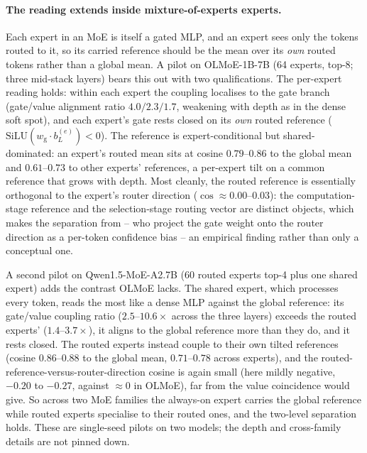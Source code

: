 \documentclass[11pt]{article}
\newcommand{\bl}{b_L}
\newcommand{\wg}{w_{\mathrm{g}}}
\begin{document}
\paragraph{The reading extends inside mixture-of-experts experts.}
Each expert in an MoE is itself a gated MLP, and an expert sees only the tokens
routed to it, so its carried reference should be the mean over its \emph{own}
routed tokens rather than a global mean. A pilot on OLMoE-1B-7B (64 experts,
top-8; three mid-stack layers) bears this out with two qualifications. The
per-expert reading holds: within each expert the coupling localises to the gate
branch (gate/value alignment ratio $4.0/2.3/1.7$, weakening with depth as in the
dense soft spot), and each expert's gate rests closed on its \emph{own} routed
reference ($\mathrm{SiLU}(\wg\!\cdot\!\bl^{(e)})<0$). The reference is
expert-conditional but shared-dominated: an expert's routed mean sits at cosine
$0.79$--$0.86$ to the global mean and $0.61$--$0.73$ to other experts' references,
a per-expert tilt on a common reference that grows with depth. Most cleanly, the
routed reference is essentially orthogonal to the expert's router direction
($\cos \approx 0.00$--$0.03$): the computation-stage reference and the
selection-stage routing vector are distinct objects, which makes the separation
from \citet{li2026confadaptive} -- who project the gate weight onto the router
direction as a per-token confidence bias -- an empirical finding rather than only
a conceptual one.

A second pilot on Qwen1.5-MoE-A2.7B (60 routed experts top-4 plus one shared
expert) adds the contrast OLMoE lacks. The shared expert, which processes every
token, reads the most like a dense MLP against the global reference: its
gate/value coupling ratio ($2.5$--$10.6\times$ across the three layers) exceeds
the routed experts' ($1.4$--$3.7\times$), it aligns to the global reference more
than they do, and it rests closed. The routed experts instead couple to their own
tilted references (cosine $0.86$--$0.88$ to the global mean, $0.71$--$0.78$ across
experts), and the routed-reference-versus-router-direction cosine is again small
(here mildly negative, $-0.20$ to $-0.27$, against $\approx 0$ in OLMoE), far from
the value coincidence would give. So across two MoE families the always-on expert
carries the global reference while routed experts specialise to their routed ones,
and the two-level separation holds. These are single-seed pilots on two models;
the depth and cross-family details are not pinned down.
\end{document}
